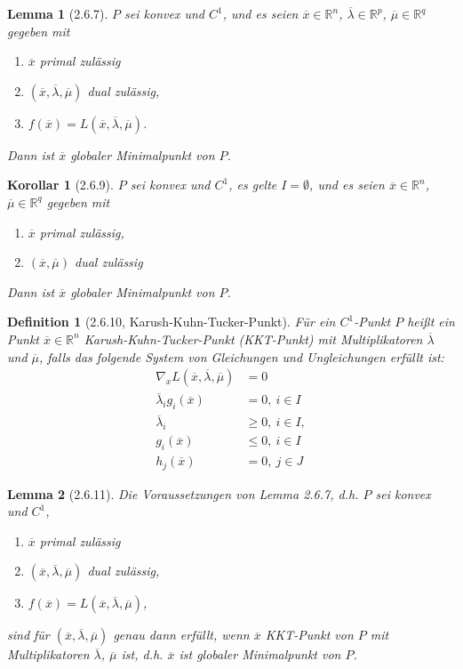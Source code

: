 \documentclass[12pt]{extreport} %
\newcommand{\R}{\mathbb{R}}
\theoremstyle{named}
\theoremstyle{nnamed}
\theoremstyle{itshape}
\newtheorem*{definition}{Definition}
\theoremstyle{normal}
\newtheorem*{korollar}{Korollar}
\newtheorem*{lemma}{Lemma}
\begin{document}
\begin{lemma}[2.6.7]
	$P$ sei konvex und $C^1$, und es seien $\overline{x} \in \R^n$, $\overline{\lambda} \in \R^p$, $\overline{\mu} \in \R^q$ gegeben mit
	\begin{enumerate}
		\item $\overline{x}$ primal zulässig
		\item $(\overline{x}, \overline{\lambda}, \overline{\mu})$ dual zulässig,
		\item $f(\overline{x}) = L(\overline{x}, \overline{\lambda}, \overline{\mu})$.
	\end{enumerate}
	Dann ist $\overline{x}$ globaler Minimalpunkt von $P$.
\end{lemma}	

\begin{korollar}[2.6.9]
	$P$ sei konvex und $C^1$, es gelte $I = \emptyset$, und es seien $\overline{x} \in \R^n$, $\overline{\mu} \in \R^q$ gegeben mit
	\begin{enumerate}
		\item $\overline{x}$ primal zulässig,
		\item $(\overline{x}, \overline{\mu})$ dual zulässig
	\end{enumerate}
	Dann ist $\overline{x}$ globaler Minimalpunkt von $P$.
\end{korollar}

\begin{definition}[2.6.10, Karush-Kuhn-Tucker-Punkt]
	Für ein $C^1$-Punkt $P$ heißt ein Punkt $\overline{x} \in \R^n$ Karush-Kuhn-Tucker-Punkt (KKT-Punkt) mit Multiplikatoren $\overline{\lambda}$ und $\overline{\mu}$, falls das folgende System von Gleichungen und Ungleichungen erfüllt ist:
	\begin{align*}
		\nabla_x L(\overline{x}, \overline{\lambda}, \overline{\mu}) & = 0 \tag*{(2.6.1)} \\
		\overline{\lambda}_i g_i(\overline{x}) & = 0, ~ i \in I \tag*{(2.6.2)} \\
		\overline{\lambda}_i & \geq 0, ~i \in I, \tag*{(2.6.3)} \\
		g_i(\overline{x}) & \leq 0, ~ i \in I \tag*{(2.6.4)} \\
		h_j(\overline{x}) & = 0, ~ j \in J \tag*{(2.6.5)} 
	\end{align*}
\end{definition}
	
\begin{lemma}[2.6.11]
	Die Voraussetzungen von Lemma 2.6.7, d.h. $P$ sei konvex und $C^1$,
	\begin{enumerate}
		\item $\overline{x}$ primal zulässig
		\item $(\overline{x}, \overline{\lambda}, \overline{\mu})$ dual zulässig,
		\item $f(\overline{x}) = L(\overline{x}, \overline{\lambda}, \overline{\mu})$,
	\end{enumerate}
	sind für $(\overline{x}, \overline{\lambda}, \overline{\mu})$ genau dann erfüllt, wenn $\overline{x}$ KKT-Punkt von $P$ mit Multiplikatoren $\overline{\lambda}$, $\overline{\mu}$ ist, d.h. $\overline{x}$ ist globaler Minimalpunkt von $P$.	
\end{lemma}
	
\end{document}
